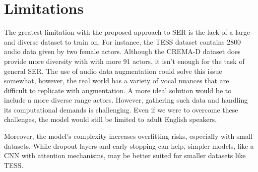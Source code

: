 \documentclass[../main.tex]{subfiles}
\begin{document}
\section{Limitations}

The greatest limitation with the proposed approach to SER is the lack of 
a large and diverse dataset to train on. For instance, the TESS dataset contains 2800 
audio data given by two female actors. Although the CREMA-D dataset does provide 
more diversity with with more 91 actors, it isn't enough for the task of general 
SER. The use of audio data augmentation could solve this issue somewhat, however, 
the real world has a variety of vocal nuances that are difficult to replicate 
with augmentation. A more ideal solution would be to 
include a more diverse range actors. However, gathering such data and handling 
its computational demands is challenging. Even if we were to overcome these 
challenges, the model would still be limited to adult English speakers.

Moreover, the model's complexity increases overfitting risks, especially with 
small datasets. While dropout layers and early stopping can help, simpler models, 
like a CNN with attention mechanisms, may be better suited for smaller datasets 
like TESS.
\end{document}
